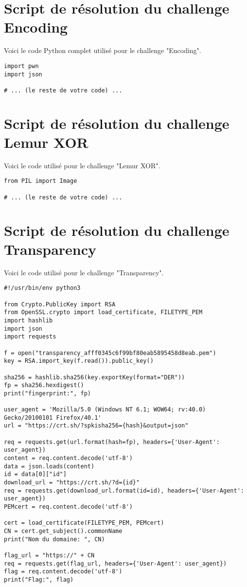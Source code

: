 
\section{Script de résolution du challenge Encoding}
\label{annexe:script-encoding}

Voici le code Python complet utilisé pour le challenge "Encoding".

\begin{verbatim}
import pwn
import json

# ... (le reste de votre code) ...
\end{verbatim}

\section{Script de résolution du challenge Lemur XOR}
\label{annexe:script-lemur}

Voici le code utilisé pour le challenge "Lemur XOR".

\begin{verbatim}
from PIL import Image

# ... (le reste de votre code) ...
\end{verbatim}


\section{Script de résolution du challenge Transparency}
\label{annexe:script-transparency}

Voici le code utilisé pour le challenge "Transparency".

\begin{verbatim}
#!/usr/bin/env python3

from Crypto.PublicKey import RSA
from OpenSSL.crypto import load_certificate, FILETYPE_PEM
import hashlib
import json
import requests

f = open("transparency_afff0345c6f99bf80eab5895458d8eab.pem")
key = RSA.import_key(f.read()).public_key()

sha256 = hashlib.sha256(key.exportKey(format="DER"))
fp = sha256.hexdigest()
print("fingerprint:", fp)

user_agent = 'Mozilla/5.0 (Windows NT 6.1; WOW64; rv:40.0) Gecko/20100101 Firefox/40.1'
url = "https://crt.sh/?spkisha256={hash}&output=json"

req = requests.get(url.format(hash=fp), headers={'User-Agent': user_agent})
content = req.content.decode('utf-8')
data = json.loads(content)
id = data[0]["id"]
download_url = "https://crt.sh/?d={id}"
req = requests.get(download_url.format(id=id), headers={'User-Agent': user_agent})
PEMcert = req.content.decode('utf-8')

cert = load_certificate(FILETYPE_PEM, PEMcert) 
CN = cert.get_subject().commonName 
print("Nom du domaine: ", CN)

flag_url = "https://" + CN
req = requests.get(flag_url, headers={'User-Agent': user_agent})
flag = req.content.decode('utf-8')
print("Flag:", flag)
\end{verbatim}


